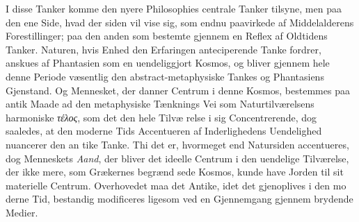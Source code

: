 \documentclass[12pt,a4paper]{book}
\newcommand{\gk}[1]{\textit{#1}}
\begin{document}
I disse Tanker komme den nyere Philosophies centrale
Tanker tilsyne, men paa den ene Side, hvad der siden vil
vise sig, som endnu paavirkede af Middelalderens Forestillinger;
paa den anden som bestemte gjennem en Reflex af Oldtidens
Tanker. Naturen, hvis Enhed den Erfaringen anteciperende
Tanke fordrer, anskues af Phantasien som en uendeliggjort
Kosmos, og bliver gjennem hele denne Periode væsentlig den
abstract-metaphysiske Tankes og Phantasiens Gjenstand. Og
Mennesket, der danner Centrum i denne Kosmos, bestemmes
paa antik Maade ad den metaphysiske Tænknings Vei som
Naturtilværelsens harmoniske \gk{τέλος}, som det den hele Tilvæ\-%
relse i sig Concentrerende, dog saaledes, at den moderne Tids
Accentueren af Inderlighedens Uendelighed nuancerer den an\-%
tike Tanke. Thi det er, hvormeget end Natursiden accentueres,
dog Menneskets \emph{Aand}, der bliver det ideelle Centrum i den
uendelige Tilværelse, der ikke mere, som Grækernes begrænd\-%
sede Kosmos, kunde have Jorden til sit materielle Centrum.
Overhovedet maa det Antike, idet det gjenoplives i den mo\-%
derne Tid, bestandig modificeres ligesom ved en Gjennemgang
gjennem brydende Medier.
\end{document}
